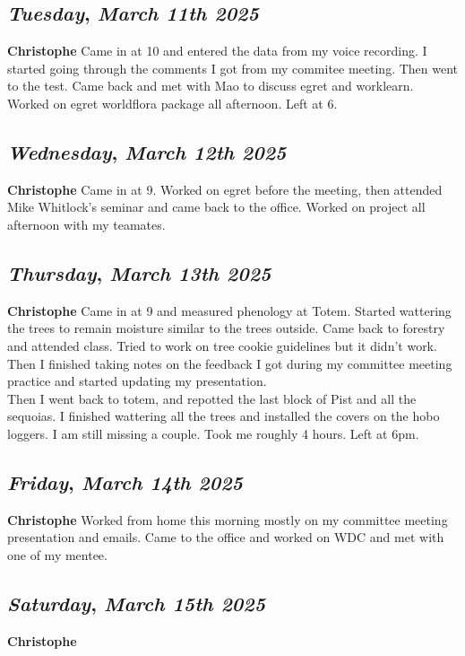 \def\day{\textit{March 11th 2025}}
\def\weekday{\textit{Tuesday}}
\subsection*{\weekday, \day}
\textbf {Christophe}
Came in at 10 and entered the data from my voice recording. I started going through the comments I got from my commitee meeting. Then went to the test. Came back and met with Mao to discuss egret and worklearn. Worked on egret worldflora package all afternoon. Left at 6.

\def\day{\textit{March 12th 2025}}
\def\weekday{\textit{Wednesday}}
\subsection*{\weekday, \day}
\textbf {Christophe}
Came in at 9. Worked on egret before the meeting, then attended Mike Whitlock's seminar and came back to the office. Worked on project all afternoon with my teamates.

\def\day{\textit{March 13th 2025}}
\def\weekday{\textit{Thursday}}
\subsection*{\weekday, \day}
\textbf {Christophe}
Came in at 9 and measured phenology at Totem. Started wattering the trees to remain moisture similar to the trees outside. Came back to forestry and attended class. Tried to work on tree cookie guidelines but it didn't work. Then I finished taking notes on the feedback I got during my committee meeting practice and started updating my presentation. \\
Then I went back to totem, and repotted the last block of Pist and all the sequoias. I finished wattering all the trees and installed the covers on the hobo loggers. I am still missing a couple. Took me roughly 4 hours. Left at 6pm. 

\def\day{\textit{March 14th 2025}}
\def\weekday{\textit{Friday}}
\subsection*{\weekday, \day}
\textbf {Christophe}
Worked from home this morning mostly on my committee meeting presentation and emails. Came to the office and worked on WDC and met with one of my mentee. 
\def\day{\textit{March 15th 2025}}
\def\weekday{\textit{Saturday}}
\subsection*{\weekday, \day}
\textbf {Christophe}

